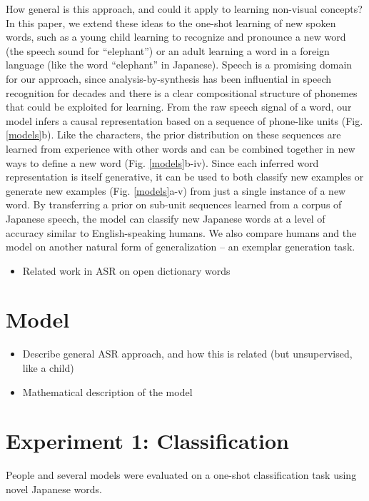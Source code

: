 \documentclass[10pt,letterpaper]{article}
\begin{document}
How general is this approach, and could it apply to learning non-visual concepts? In this paper, we extend these ideas to the one-shot learning of new spoken words, such as a young child learning to recognize and pronounce a new word (the speech sound for ``elephant'') or an adult learning a word in a foreign language (like the word ``elephant'' in Japanese). Speech is a promising domain for our approach, since analysis-by-synthesis has been influential in speech recognition for decades \cite{Halle1962,Liberman1967} and there is a clear compositional structure of phonemes that could be exploited for learning. From the raw speech signal of a word, our model infers a causal representation based on a sequence of phone-like units (Fig. \ref{models}b). Like the characters, the prior distribution on these sequences are learned from experience with other words and can be combined together in new ways to define a new word (Fig. \ref{models}b-iv). Since each inferred word representation is itself generative, it can be used to both classify new examples or generate new examples (Fig. \ref{models}a-v) from just a single instance of a new word. By transferring a prior on sub-unit sequences learned from a corpus of Japanese speech, the model can classify new Japanese words at a level of accuracy similar to English-speaking humans. We also compare humans and the model on another natural form of generalization -- an exemplar generation task.

\begin{itemize}
	\item Related work in ASR on open dictionary words
\end{itemize}

\section{Model}

\begin{itemize}
\item Describe general ASR approach, and how this is related (but unsupervised, like a child)
\item Mathematical description of the model
\end{itemize}

\section{Experiment 1: Classification}
People and several models were evaluated on a one-shot classification task using novel Japanese words. 
\end{document}
